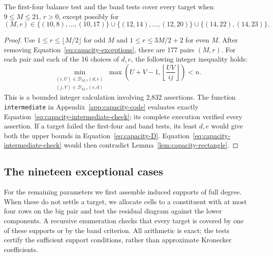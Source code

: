 \begin{lemma}
\label{lem:capacity-intermediate}
The first-four balance test and the band tests cover every target
when $9\le M\le21$, $r>0$, except possibly for
\begin{equation}
 (M,r)\in
 \{(10,8),\ldots,(10,17)\}
 \cup\{(12,14),\ldots,(12,20)\}
 \cup\{(14,22),(14,23)\}.
 \label{eq:capacity-exceptions}
\end{equation}
\end{lemma}

\begin{proof}
Use $1\le r\le\lfloor M/2\rfloor$ for odd $M$ and
$1\le r\le3M/2+2$ for even $M$. After removing
Equation~\eqref{eq:capacity-exceptions}, there are 177 pairs $(M,r)$.
For each pair and each of the 16 choices of $d,e$, the following
integer inequality holds:
\begin{equation}
 \min_{\substack{(i,U)\in\mathcal D_{M,r}(d,e)\\
                 (j,V)\in\mathcal D_{M,r}(e,d)}}
 \max\left(U+V-1,\left\lfloor\frac{UV}{ij}\right\rfloor\right)<n.
 \label{eq:capacity-intermediate-check}
\end{equation}
This is a bounded integer calculation involving 2,832 assertions.
The function \texttt{intermediate} in
Appendix~\ref{app:capacity-code} evaluates exactly
Equation~\eqref{eq:capacity-intermediate-check}; its complete execution
verified every assertion. If a target failed the first-four and band
tests, its least $d,e$ would give both the upper bounds in
Equation~\eqref{eq:capacity-D}. Equation~\eqref{eq:capacity-intermediate-check}
would then contradict Lemma~\ref{lem:capacity-rectangle}.
\end{proof}

\subsection{The nineteen exceptional cases}

For the remaining parameters we first assemble induced supports of full
degree. When these do not settle a target, we allocate cells to a
constituent with at most four rows on the big pair and test the residual diagram
against the lower components. A recursive enumeration checks that every
target is covered by one of these supports or by the band criterion.
All arithmetic is exact; the tests certify the sufficient support
conditions, rather than approximate Kronecker coefficients.

